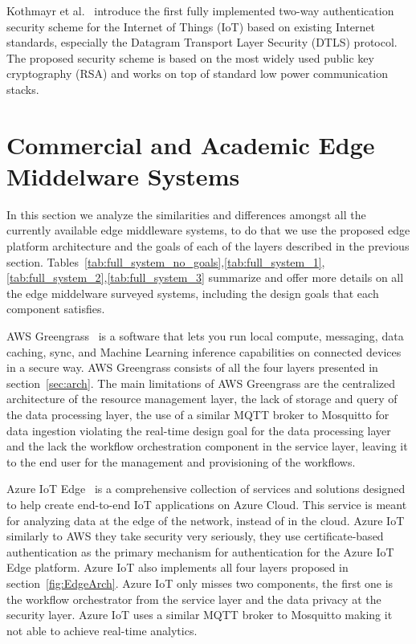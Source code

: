 Kothmayr et al.~\cite{6424088} introduce the first fully implemented two-way authentication security scheme for the Internet of Things (IoT) based on existing Internet standards, especially the Datagram Transport Layer Security (DTLS) protocol. The proposed security scheme is based on the most widely used public key cryptography (RSA) and works on top of standard low power communication stacks. 

\section{Commercial and Academic Edge Middelware Systems}
In this section we analyze the similarities and differences amongst all the currently available edge middleware systems, to do that we use the proposed edge platform architecture and the goals of each of the layers described in the previous section. Tables~\ref{tab:full_system_no_goals},\ref{tab:full_system_1},\ref{tab:full_system_2},\ref{tab:full_system_3} summarize and offer more details on all the edge middelware surveyed systems, including the design goals that each component satisfies.

AWS Greengrass~\cite{greengrass} is a software that lets you run local compute, messaging, data caching, sync, and Machine Learning inference capabilities on connected devices in a secure way. AWS Greengrass consists of all the four layers presented in section~\ref{sec:arch}. The main limitations of AWS Greengrass are the centralized architecture of the resource management layer, the lack of storage and query of the data processing layer,  the use of a similar MQTT broker to Mosquitto for data ingestion violating the real-time design goal for the data processing layer and the lack the workflow orchestration component in the service layer, leaving it to the end user for the management and provisioning of the workflows. 

Azure IoT Edge~\cite{azure} is a comprehensive collection of services and solutions designed to help create end-to-end IoT applications on Azure Cloud. This service is meant for analyzing data at the edge of the network, instead of in the cloud. Azure IoT similarly to AWS they take security very seriously, they use certificate-based authentication as the primary mechanism for authentication for the Azure IoT Edge platform. Azure IoT also implements all four layers proposed in section~\ref{fig:EdgeArch}. Azure IoT only misses two components, the first one is the workflow orchestrator from the service layer and the data privacy at the security layer. Azure IoT uses a similar MQTT broker to Mosquitto making it not able to achieve real-time analytics.

